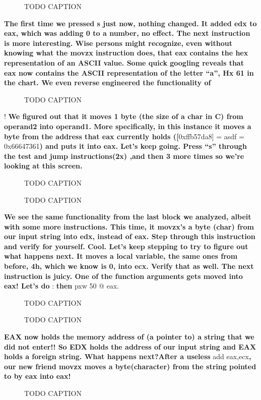\documentclass[letterpaper]{article}
\newcommand{\sitfig}[3]{
\begin{figure}[H]
\centering
\makebox[\textwidth][c]{
#2
}
\caption{#3}
\label{#1}
\end{figure}
}
\newcommand{\sitgfx}[4][scale=1.0]{
\sitfig{#3}{\texttt{[image: \#2]}}{#4}
}
\begin{document}
  
\sitgfx[width=6.5in,height=2.5138in]{FINALWORKINGDOCFORMERLYPRECURSOR-img036.png}{fig:unk}{TODO CAPTION}
\textbf{The first time we pressed s just now, nothing changed. It added edx to eax, which was adding 0 to a number, no
effect. The next instruction is more interesting. Wise persons might recognize, even without knowing what the movzx
instruction does, that eax contains the hex representation of an ASCII value. Some quick googling reveals that eax now
contains the ASCII representation of the letter ``a'', Hx 61 in the chart. We even reverse engineered the functionality
of }  
\sitgfx[width=6.3543in,height=0.2291in]{FINALWORKINGDOCFORMERLYPRECURSOR-img037.png}{fig:unk}{TODO CAPTION}
 !\newline
\textbf{We figured out that it moves 1 byte (the size of a char in C) from operand2 into operand1.  More specifically,
in this instance it moves a byte from the address that eax currently holds ([}0xffb57da8] = asdf = 0x66647361\textbf{)
and puts it into eax. Let's keep going. Press ``s'' through the test and jump instructions(2x) ,and then 3 more times
so we're looking at this screen.}  
\sitgfx[width=6.5in,height=1.8335in]{FINALWORKINGDOCFORMERLYPRECURSOR-img038.png}{fig:unk}{TODO CAPTION}
 

\begin{center}
 
  \sitgfx[width=1.6043in,height=4.9272in]{FINALWORKINGDOCFORMERLYPRECURSOR-img039.png}{fig:unk}{TODO CAPTION}

\end{center}
\textbf{We see the same functionality from the last block we analyzed, albeit with some more instructions. This time, it
movzx's a byte (char) from our input string into edx, instead of eax. Step through this instruction and verify for
yourself.\newline
Cool. Let's keep stepping to try to figure out what happens next. It moves a local variable, the same ones from before,
4h, which we know is 0, into ecx. Verify that as well. The next instruction is juicy. One of the function arguments
gets moved into eax! Let's do} : \textbf{then }pxw 50 @ eax.   
\sitgfx[width=6.5in,height=4.5138in]{FINALWORKINGDOCFORMERLYPRECURSOR-img040.png}{fig:unk}{TODO CAPTION}
 

\begin{center}
 
  \sitgfx[width=1.8543in,height=0.2189in]{FINALWORKINGDOCFORMERLYPRECURSOR-img041.png}{fig:unk}{TODO CAPTION}

\end{center}
\textbf{EAX now holds the memory address of (a pointer to) a string that we did not enter!! So EDX holds the address of
our input string and EAX holds a foreign string. What happens next?After a useless }add eax,ecx\textbf{, our new friend
movzx moves a byte(character) from the string pointed to by eax into eax! }  
\sitgfx[width=6.5in,height=2.0555in]{FINALWORKINGDOCFORMERLYPRECURSOR-img042.png}{fig:unk}{TODO CAPTION}
 
\end{document}
